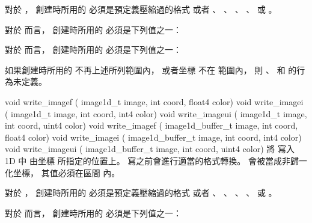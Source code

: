 對於 ，
創建時所用的  必須是預定義壓縮過的格式
或者 、 、 、
 、  或 。

對於  而言，
創建時所用的  必須是下列值之一：
\startigBase
\item {}
\item {}
\item {}
\stopigBase

對於  而言，
創建時所用的  必須是下列值之一：
\startigBase
\item {}
\item {}
\item {}
\stopigBase

如果創建時所用的  不再上述所列範圍內，
或者坐標  不在 
範圍內，
則 、  和  的行為未定義。
\stopbuffer

void write_imagef (
	image1d_t image,
	int coord,
	float4 color)
void write_imagei (
	image1d_t image,
	int coord,
	int4 color)
void write_imageui (
	image1d_t image,
	int coord,
	uint4 color)
void write_imagef (
	image1d_buffer_t image,
	int coord,
	float4 color)
void write_imagei (
	image1d_buffer_t image,
	int coord,
	int4 color)
void write_imageui (
	image1d_buffer_t image,
	int coord,
	uint4 color)
\stopbuffer
{}
將  寫入 1D   中
由坐標  所指定的位置上。
寫之前會進行適當的格式轉換。
 會被當成非歸一化坐標，
其值必須在區間  內。

對於 ，
創建時所用的  必須是預定義壓縮過的格式
或者 、 、 、
 、  或 。

對於  而言，
創建時所用的  必須是下列值之一：
\startigBase
\item {}
\item {}
\item {}
\stopigBase

